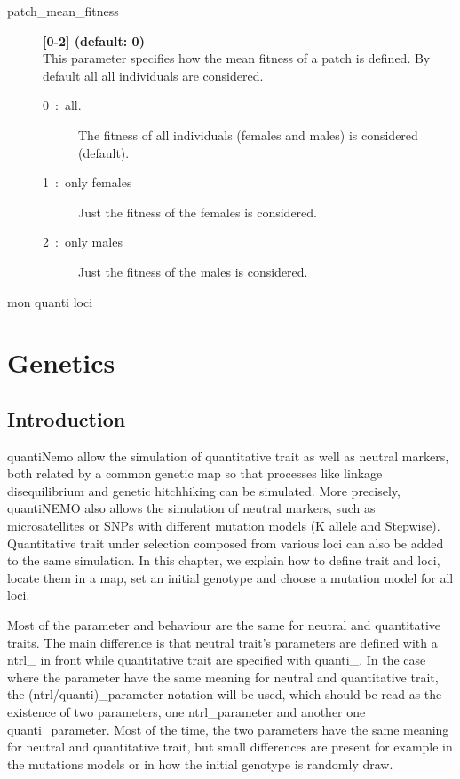 \documentclass[letterpaper,12pt,oneside]{book}
\begin{document}
\begin{description}
\item[patch\_mean\_fitness] \textbf{[0-2] (default: 0)}\\
This parameter specifies how the mean fitness of a patch is defined. By default all all individuals are considered.
\begin{description}
\item [0~:~all.] The fitness of all individuals (females and males) is considered (default).
\item [1~:~only females] Just the fitness of the females is considered.
\item [2~:~only males] Just the fitness of the males is considered.
\end{description}

\end{description}
mon quanti loci 
\newpage
\chapter{Genetics}\label{chap:quanti}
\section{Introduction}
quantiNemo allow the simulation of quantitative trait as well as neutral markers, both related by a common genetic map so that processes like linkage disequilibrium and genetic hitchhiking can be simulated. More precisely, quantiNEMO also allows the simulation of neutral markers, such as microsatellites or SNPs with different mutation models (K allele and Stepwise). Quantitative trait under selection composed from various loci can also be added to the same simulation. In this chapter, we explain how to define trait and loci, locate them in a map, set an initial genotype and choose a mutation model for all loci. 

Most of the parameter and behaviour are the same for neutral and quantitative traits. The main difference is that neutral trait's parameters are defined with a \textsf{ntrl\_} in front while quantitative trait are specified with  \textsf{quanti\_}. In the case where the parameter have the same meaning for neutral and quantitative trait, the \textsf{(ntrl/quanti)\_parameter} notation will be used, which should be read as the existence of two parameters, one \textsf{ntrl\_parameter} and another one \textsf{quanti\_parameter}.  Most of the time, the two parameters have the same meaning for neutral and quantitative trait, but small differences are present for example in the mutations models or in how the initial genotype is randomly draw. 
\end{document}
